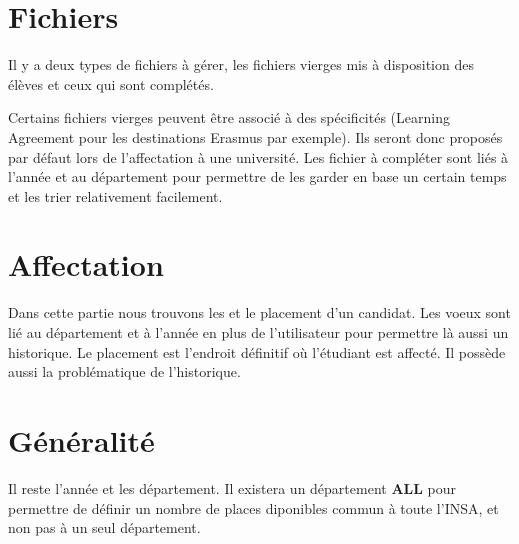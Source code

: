 \section{Fichiers}

Il y a deux types de fichiers à gérer, les fichiers vierges mis à disposition des élèves et ceux qui sont complétés.

Certains fichiers vierges peuvent être associé à des spécificités (Learning Agreement pour les destinations Erasmus par exemple). Ils seront donc proposés par défaut lors de l'affectation à une université.
Les fichier à compléter sont liés à l'année et au département pour permettre de les garder en base un certain temps et les trier relativement facilement.

\section{Affectation}

Dans cette partie nous trouvons les \voe et le placement d'un candidat. Les voeux sont lié au département et à l'année en plus de l'utilisateur pour permettre là aussi un historique.
Le placement est l'endroit définitif où l'étudiant est affecté. Il possède aussi la problématique de l'historique.

\section{Généralité}

Il reste l'année et les département. 
Il existera un département \textbf{ALL} pour permettre de définir un nombre de places diponibles commun à toute l'INSA, et non pas à un seul département.



